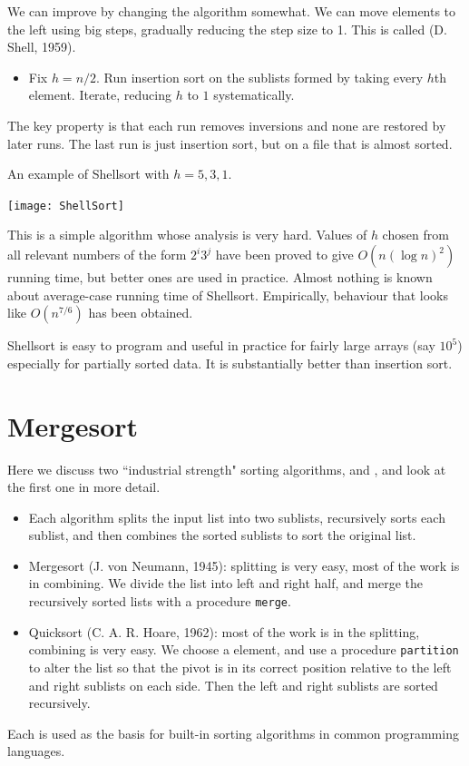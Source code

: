 We can improve by changing the algorithm somewhat.
We can move elements to the left using big steps, gradually reducing the 
step size to 1. This is called  (D. Shell, 1959). 
\begin{itemize}
  \item Fix $h = n/2$. Run insertion sort on the sublists formed by taking 
every $h$th element. Iterate, reducing $h$ to $1$ systematically. 
\end{itemize}
The key property is that each run removes inversions and none are 
restored by later runs. The last run is just insertion sort, but on a file that 
is almost sorted.

\begin{Boxample}
An example of Shellsort with $h = 5, 3, 1$.
\begin{center}
  \texttt{[image: ShellSort]} 
\end{center}
\end{Boxample}

This is a simple algorithm whose analysis is very hard. 
Values of $h$ chosen from all relevant numbers of the form $2^i 3^j$ have been proved to give 
$O(n (\log n)^2)$ running time, but better ones are used in practice. 
Almost nothing is known about average-case running time of Shellsort. 
Empirically, behaviour that looks like $O(n^{7/6})$ has been obtained. 

Shellsort is easy to program and useful in practice for fairly large arrays (say $10^5$) especially for partially sorted data. 
It is substantially  better than insertion sort.


\chapter{Mergesort}  %
\label{sec:mergesort}
Here we discuss two ``industrial strength" sorting algorithms,
 and , and look at the first one
in more detail. 
\begin{itemize}
\item Each algorithm splits the input list into two sublists, 
recursively sorts each sublist, and then combines the sorted sublists to sort 
the original list.
\item Mergesort (J. von Neumann, 1945): splitting is very easy, most 
of the work is in combining. 
We divide the list into left and right half, and merge the recursively sorted 
lists with a procedure \texttt{merge}. 
\item Quicksort (C. A. R. Hoare, 1962): most of the work is in the 
splitting, combining is very easy. We choose a  element, and use a 
procedure \texttt{partition} to alter the list so that the pivot is in its 
correct position relative to the left and right sublists on each side.
Then the left and right sublists are sorted recursively.
\end{itemize}
Each is used as the basis for 
built-in sorting algorithms in common programming languages.

